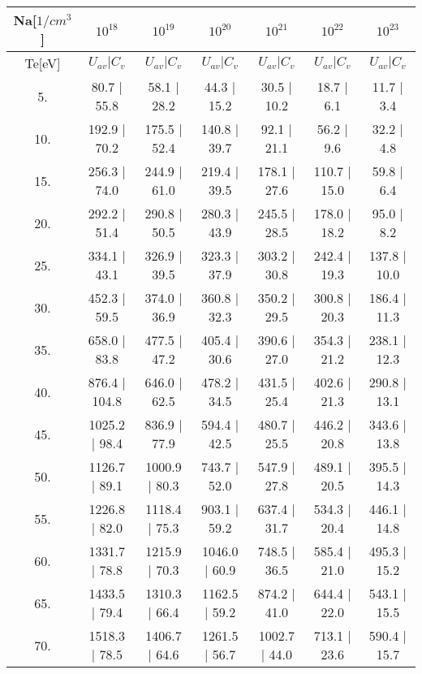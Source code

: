 \begin{tabular}{|c||c|c|c|c|c|c|}
\hline
Na[$1/cm^3$] & $10^{18}$ & $10^{19}$ & $10^{20}$ & $10^{21}$ & $10^{22}$ & $10^{23}$\tabularnewline
\hline
Te[eV] & $U_{av} | C_v$ & $U_{av} | C_v$ & $U_{av} | C_v$ & $U_{av} | C_v$ & $U_{av} | C_v$ & $U_{av} | C_v$\tabularnewline
\hline
\hline
   5. &     80.7 |    55.8 &     58.1 |    28.2 &     44.3 |    15.2 &     30.5 |    10.2 &     18.7 |     6.1 &     11.7 |     3.4\tabularnewline
\hline
  10. &    192.9 |    70.2 &    175.5 |    52.4 &    140.8 |    39.7 &     92.1 |    21.1 &     56.2 |     9.6 &     32.2 |     4.8\tabularnewline
\hline
  15. &    256.3 |    74.0 &    244.9 |    61.0 &    219.4 |    39.5 &    178.1 |    27.6 &    110.7 |    15.0 &     59.8 |     6.4\tabularnewline
\hline
  20. &    292.2 |    51.4 &    290.8 |    50.5 &    280.3 |    43.9 &    245.5 |    28.5 &    178.0 |    18.2 &     95.0 |     8.2\tabularnewline
\hline
  25. &    334.1 |    43.1 &    326.9 |    39.5 &    323.3 |    37.9 &    303.2 |    30.8 &    242.4 |    19.3 &    137.8 |    10.0\tabularnewline
\hline
  30. &    452.3 |    59.5 &    374.0 |    36.9 &    360.8 |    32.3 &    350.2 |    29.5 &    300.8 |    20.3 &    186.4 |    11.3\tabularnewline
\hline
  35. &    658.0 |    83.8 &    477.5 |    47.2 &    405.4 |    30.6 &    390.6 |    27.0 &    354.3 |    21.2 &    238.1 |    12.3\tabularnewline
\hline
  40. &    876.4 |   104.8 &    646.0 |    62.5 &    478.2 |    34.5 &    431.5 |    25.4 &    402.6 |    21.3 &    290.8 |    13.1\tabularnewline
\hline
  45. &   1025.2 |    98.4 &    836.9 |    77.9 &    594.4 |    42.5 &    480.7 |    25.5 &    446.2 |    20.8 &    343.6 |    13.8\tabularnewline
\hline
  50. &   1126.7 |    89.1 &   1000.9 |    80.3 &    743.7 |    52.0 &    547.9 |    27.8 &    489.1 |    20.5 &    395.5 |    14.3\tabularnewline
\hline
  55. &   1226.8 |    82.0 &   1118.4 |    75.3 &    903.1 |    59.2 &    637.4 |    31.7 &    534.3 |    20.4 &    446.1 |    14.8\tabularnewline
\hline
  60. &   1331.7 |    78.8 &   1215.9 |    70.3 &   1046.0 |    60.9 &    748.5 |    36.5 &    585.4 |    21.0 &    495.3 |    15.2\tabularnewline
\hline
  65. &   1433.5 |    79.4 &   1310.3 |    66.4 &   1162.5 |    59.2 &    874.2 |    41.0 &    644.4 |    22.0 &    543.1 |    15.5\tabularnewline
\hline
  70. &   1518.3 |    78.5 &   1406.7 |    64.6 &   1261.5 |    56.7 &   1002.7 |    44.0 &    713.1 |    23.6 &    590.4 |    15.7\tabularnewline

\end{tabular}
